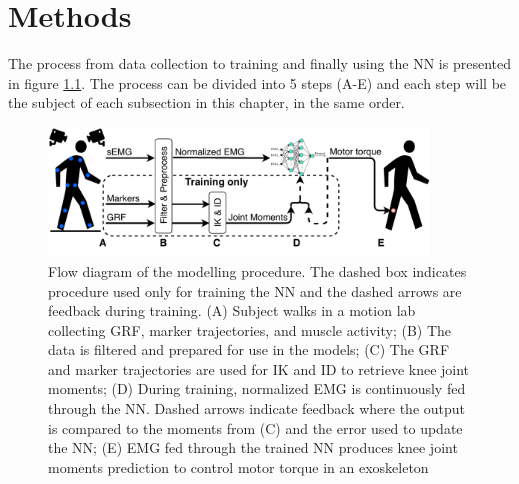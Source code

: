 \documentclass[../main.tex]{subfiles}
\begin{document}
\chapter{Methods}
\label{sec:methods}
The process from data collection to training and finally using the \ac{NN} is presented in figure \ref{fig:process-diagram}. 
The process can be divided into 5 steps (A-E) and each step will be the subject of each subsection in this chapter, in the same order.
\begin{figure}[ht]
    \centering
    \includegraphics[width=0.9\textwidth]{img/ProcessDiagram}
    \caption{Flow diagram of the modelling procedure. The dashed box indicates procedure used only for training the \ac{NN} and the dashed arrows are feedback during training. (A) Subject walks in a motion lab collecting \acf{GRF}, marker trajectories, and muscle activity; (B) The data is filtered and prepared for use in the models; (C) The \ac{GRF} and marker trajectories are used for \ac{IK} and \ac{ID} to retrieve knee joint moments; (D) During training, normalized \ac{EMG} is continuously fed through the \ac{NN}. Dashed arrows indicate feedback where the output is compared to the moments from (C) and the error used to update the \ac{NN}; (E) \ac{EMG} fed through the trained \ac{NN} produces knee joint moments prediction to control motor torque in an exoskeleton}
    \label{fig:process-diagram}
\end{figure}
\end{document}
